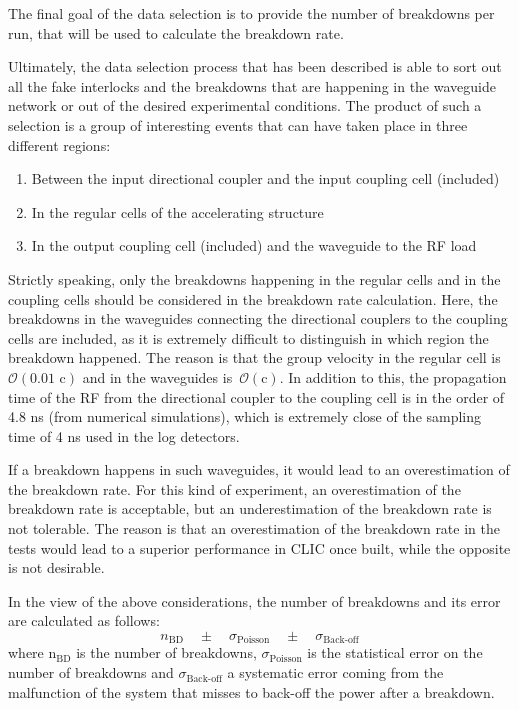 The final goal of the data selection is to provide the number of breakdowns per run, that will be used to calculate the breakdown rate. 

Ultimately, the data selection process that has been described is able to sort out all the fake interlocks and the breakdowns that are happening in the waveguide network or out of the desired experimental conditions. The product of such a selection is a group of interesting events that can have taken place in three different regions:
\begin{enumerate}
\item Between the input directional coupler and the input coupling cell (included)
\item In the regular cells of the accelerating structure
\item In the output coupling cell (included) and the waveguide to the RF load
\end{enumerate}
Strictly speaking, only the breakdowns happening in the regular cells and in the coupling cells should be considered in the breakdown rate calculation. Here, the breakdowns in the waveguides connecting the directional couplers to the coupling cells are included, as it is extremely difficult to distinguish in which region the breakdown happened. The reason is that the group velocity in the regular cell is $\mathcal{O}(\text{0.01 c})$ and in the waveguides is~$\mathcal{O}(\text{c})$. In addition to this, the propagation time of the RF from the directional coupler to the coupling cell is in the order of 4.8 ns (from numerical simulations), which is extremely close of the sampling time of 4 ns used in the log detectors. 

If a breakdown happens in such waveguides, it would lead to an overestimation of the breakdown rate. For this kind of experiment, an overestimation of the breakdown rate is acceptable, but an underestimation of the breakdown rate is not tolerable. The reason is that an overestimation of the breakdown rate in the tests would lead to a superior performance in CLIC once built, while the opposite is not desirable.   

In the view of the above considerations, the number of breakdowns and its error are calculated as follows:
\begin{equation}
n_{\text{BD}} \quad \pm \quad \sigma_{\text{Poisson}} \quad \pm \quad \sigma_{\text{Back-off}} 
\label{numBD}
\end{equation}
where  n$_{\text{BD}}$ is the number of breakdowns, $\sigma_{\text{Poisson}}$ is the statistical error on the number of breakdowns and $\sigma_{\text{Back-off}}$ a systematic error coming from the malfunction of the system that misses to back-off the power after a breakdown.

